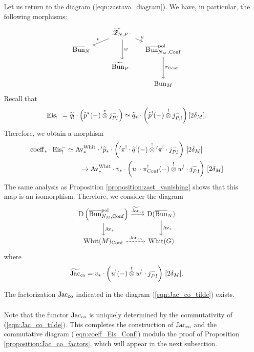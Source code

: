 \subsubsection{} Let us return to the diagram (\ref{eqn:zastava_diagram}). We have, in particular, the following morphisms:
\[
\begin{tikzcd}[
    column sep={6em,between origins},
    row sep={2.5em,between origins}
    ]
    & \ZZt_{N,P^-} \arrow[dr, "u"] \arrow[dd, "w"] \arrow[dl, "v" above left] & \\
    \Bunc_N & & \Bunc_{N_M,\Conf}^\pol \arrow[dd, "\pi_\Conf"] \\
    & \Bunt_{P^-} & \\
    & & \Bun_M 
\end{tikzcd}
\]
Recall that
  \[\mathrm{Eis}_!^- = \widetilde{q}_! \cdot \left( \widetilde{p}^*(-) \overset{*}{\otimes} j_{P,!}^-\right) \simeq \widetilde{q}_* \cdot \left( \widetilde{p}^!(-) \overset{!}{\otimes} j_{P,!}^- \right) [2 \delta_M].\]
Therefore, we obtain a morphism
    \begin{align*}
    \mathrm{coeff}_* \cdot \mathrm{Eis}_!^- 
    & \simeq \mathrm{Av}_*^{\mathrm{Whit}} \cdot {'}\widetilde{p}_* \cdot \left( {'}\pi^! \cdot \widetilde{q}^!(-) \overset{!}{\otimes} {'}\pi^! \cdot j_{P,!}^- \right) \, [2 \delta_M]\\
    & \qquad \to \mathrm{Av}_*^{\mathrm{Whit}} \cdot v_* \cdot \left( u^! \cdot \pi_{\mathrm{Conf}}^! (-) \overset{!}{\otimes} w^! \cdot j_{P,!}^- \right) \, [2 \delta_M]
    \end{align*}
The same analysis as Proposition \ref{proposition:zast_vanishing} shows that this map is an isomorphism. Therefore, we consider the diagram
\begin{equation}
\label{eqn:Jac_co_tilde}
\begin{tikzcd}[
          column sep={8.5em,between origins},
          row sep={4em,between origins}
        ]
  \DMod\left( \Bunc_{N_M, \Conf}^\pol \right) \arrow[r, "\Jact_\co"] \arrow[d, "\Av_*"] & \DMod(\Bunc_N) \arrow[d, "\Av_*"] \\
  \Whit(M)_\Conf \arrow[r, dashed, "\Jac_\co"] & \Whit(G)
\end{tikzcd}
\end{equation}
where
  \[\widetilde{\mathrm{Jac}}_{\mathrm{co}} = v_* \cdot \left( u^!(-) \overset{!}{\otimes} w^! \cdot j_{P,!}^- \right) \, [2\delta_M].\]

\begin{proposition}
\label{proposition:Jac_co_factors}
The factorization $\mathrm{Jac}_{\mathrm{co}}$ indicated in the diagram (\ref{eqn:Jac_co_tilde}) exists.
\end{proposition}

\subsubsection{} Note that the functor $\mathrm{Jac}_{\mathrm{co}}$ is uniquely determined by the commutativity of (\ref{eqn:Jac_co_tilde}). This completes the construction of $\mathrm{Jac}_{\mathrm{co}}$ and the commutative diagram (\ref{eqn:coeff_Eis_Conf}) modulo the proof of Proposition \ref{proposition:Jac_co_factors}, which will appear in the next subsection.

